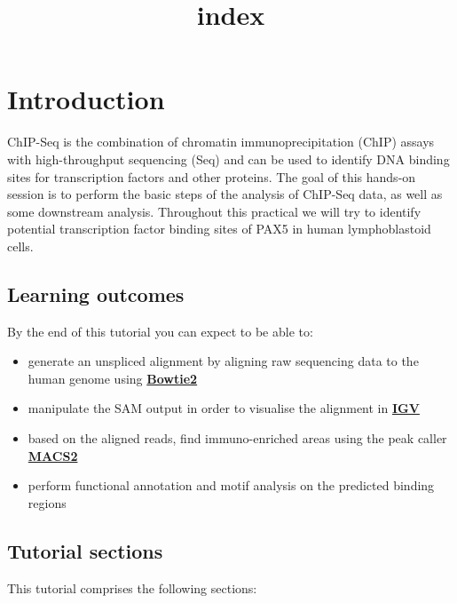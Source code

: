 \documentclass[11pt]{article}
\title{index}
\providecommand{\tightlist}{%
      \setlength{\itemsep}{0pt}\setlength{\parskip}{0pt}}
\begin{document}
    \hypertarget{introduction}{%
\section{Introduction}\label{introduction}}

ChIP-Seq is the combination of chromatin immunoprecipitation (ChIP)
assays with high-throughput sequencing (Seq) and can be used to identify
DNA binding sites for transcription factors and other proteins. The goal
of this hands-on session is to perform the basic steps of the analysis
of ChIP-Seq data, as well as some downstream analysis. Throughout this
practical we will try to identify potential transcription factor binding
sites of PAX5 in human lymphoblastoid cells.

\hypertarget{learning-outcomes}{%
\subsection{Learning outcomes}\label{learning-outcomes}}

By the end of this tutorial you can expect to be able to:

\begin{itemize}
\tightlist
\item
  generate an unspliced alignment by aligning raw sequencing data to the
  human genome using
  \textbf{\href{http://bowtie-bio.sourceforge.net/bowtie2/index.shtml}{Bowtie2}}
\item
  manipulate the SAM output in order to visualise the alignment in
  \textbf{\href{http://software.broadinstitute.org/software/igv/}{IGV}}
\item
  based on the aligned reads, find immuno-enriched areas using the peak
  caller \textbf{\href{https://github.com/taoliu/MACS}{MACS2}}
\item
  perform functional annotation and motif analysis on the predicted
  binding regions
\end{itemize}

\hypertarget{tutorial-sections}{%
\subsection{Tutorial sections}\label{tutorial-sections}}

This tutorial comprises the following sections:
\end{document}
